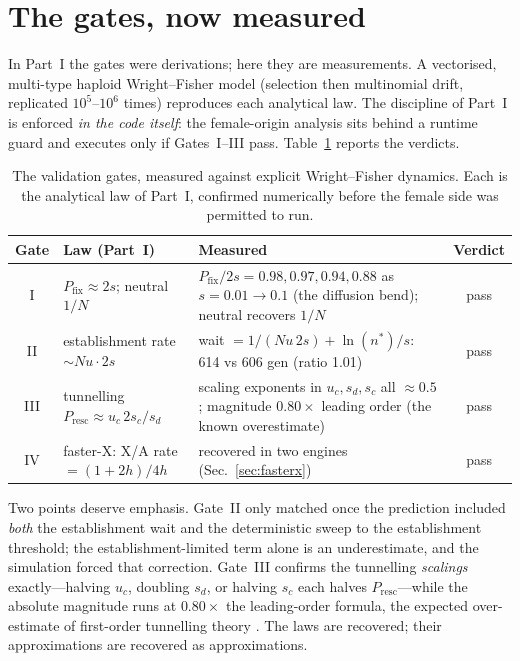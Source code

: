\documentclass[11pt,a4paper]{article}
\newcommand{\Pfix}{P_{\mathrm{fix}}}
\newcommand{\Presc}{P_{\mathrm{resc}}}
\begin{document}
\section{The gates, now measured}

In Part~I the gates were derivations; here they are measurements. A vectorised, multi-type haploid Wright--Fisher model (selection then multinomial drift, replicated $10^{5}$--$10^{6}$ times) reproduces each analytical law. The discipline of Part~I is enforced \emph{in the code itself}: the female-origin analysis sits behind a runtime guard and executes only if Gates~I--III pass. Table~\ref{tab:gates} reports the verdicts.

\begin{table}[h!]
\centering\small
\caption{The validation gates, measured against explicit Wright--Fisher dynamics. Each is the analytical law of Part~I, confirmed numerically before the female side was permitted to run.}
\label{tab:gates}
\begin{tabular}{c p{6.0cm} p{5.4cm} c}
\toprule
\textbf{Gate} & \textbf{Law (Part~I)} & \textbf{Measured} & \textbf{Verdict} \\
\midrule
I & $\Pfix\approx 2s$; neutral $1/N$ & $\Pfix/2s = 0.98,0.97,0.94,0.88$ as $s{=}0.01\!\to\!0.1$ (the diffusion bend); neutral recovers $1/N$ & pass \\
II & establishment rate $\sim Nu\cdot 2s$ & wait $=1/(Nu\,2s)+\ln(n^\ast)/s$: 614 vs 606 gen (ratio 1.01) & pass \\
III & tunnelling $\Presc\approx u_c\,2s_c/s_d$ & scaling exponents in $u_c,s_d,s_c$ all $\approx 0.5$; magnitude $0.80\times$ leading order (the known overestimate) & pass \\
IV & faster-X: X/A rate $=(1{+}2h)/4h$ & recovered in two engines (Sec.~\ref{sec:fasterx}) & pass \\
\bottomrule
\end{tabular}
\end{table}

Two points deserve emphasis. Gate~II only matched once the prediction included \emph{both} the establishment wait and the deterministic sweep to the establishment threshold; the establishment-limited term alone is an underestimate, and the simulation forced that correction. Gate~III confirms the tunnelling \emph{scalings} exactly---halving $u_c$, doubling $s_d$, or halving $s_c$ each halves $\Presc$---while the absolute magnitude runs at $0.80\times$ the leading-order formula, the expected over-estimate of first-order tunnelling theory \citep{iwasa2004}. The laws are recovered; their approximations are recovered as approximations.
\end{document}
